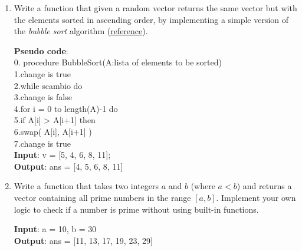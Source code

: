 \documentclass[oneside]{article}
\begin{document}
\begin{enumerate}
	\item
	      Write a function that given a random vector returns the same vector but with the elements sorted in ascending order, by implementing a simple version of the {\it bubble sort} algorithm (\href{https://it.wikipedia.org/wiki/Bubble_sort}{reference}).
	      \begin{tcolorbox}[blanker, breakable, left=5mm, before skip=10pt, after skip=10pt,borderline west={1mm}{0pt}{primarycolor}]
		      \textbf{Pseudo code}:\\
		      0. procedure BubbleSort(A:lista of elements to be sorted)\\
		      1.\hspace{1em}change is true\\
		      2.\hspace{1em}while scambio do\\
		      3.\hspace{2em}change is false\\
		      4.\hspace{2em}for i = 0 to length(A)-1  do\\
		      5.\hspace{3em}if A[i] > A[i+1] then\\
		      6.\hspace{4em}swap( A[i], A[i+1] ) \\
		      7.\hspace{4em}change is true\\
		      \textbf{Input}: v = [5, 4, 6, 8, 11];\\
		      \textbf{Output}: ans = [4, 5, 6, 8, 11]
	      \end{tcolorbox}

	\item
	      Write a function that takes two integers $a$ and $b$ (where $a < b$) and returns a vector containing all prime numbers in the range $[a, b]$. Implement your own logic to check if a number is prime without using built-in functions.
	      \begin{tcolorbox}[blanker, breakable, left=5mm, before skip=10pt, after skip=10pt, borderline west={1mm}{0pt}{primarycolor}]
		      \textbf{Input}: a = 10, b = 30 \\
		      \textbf{Output}: ans = [11, 13, 17, 19, 23, 29]
	      \end{tcolorbox}


\end{enumerate}
\end{document}
